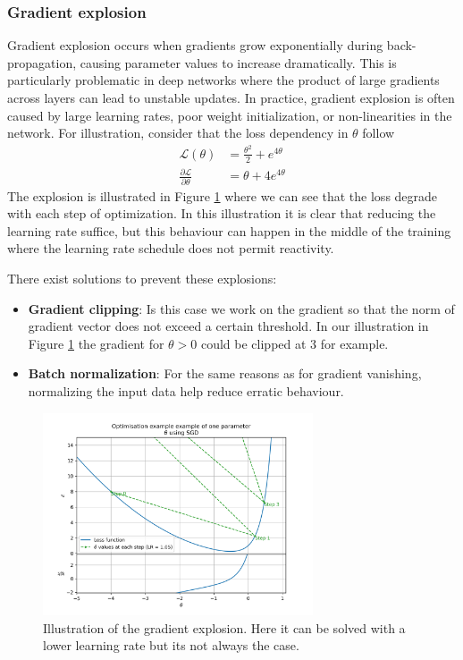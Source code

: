 \documentclass[../main.tex]{subfiles}
\begin{document}
\subsubsection{Gradient explosion}
Gradient explosion occurs when gradients grow exponentially during back-propagation, causing parameter values to increase dramatically. This is particularly problematic in deep networks where the product of large gradients across layers can lead to unstable updates. In practice, gradient explosion is often caused by large learning rates, poor weight initialization, or non-linearities in the network.
For illustration, consider that the loss dependency in $\theta$ follow
\begin{align*}
  \mathcal{L}(\theta) &= \frac{\theta^2}{2} + e^{4\theta} \\
  \frac{\partial \mathcal{L}}{\partial \theta} &= \theta + 4e^{4\theta}
\end{align*}
The explosion is illustrated in Figure \ref{fig:ml:explosion} where we can see that the loss degrade with each step of optimization. In this illustration it is clear that reducing the learning rate suffice, but this behaviour can happen in the middle of the training where the learning rate schedule does not permit reactivity.

There exist solutions to prevent these explosions:
\begin{itemize}
  \item \textbf{Gradient clipping}: Is this case we work on the gradient so that the norm of gradient vector does not exceed a certain threshold. In our illustration in Figure \ref{fig:ml:explosion} the gradient for $\theta > 0$ could be clipped at 3 for example.
  \item \textbf{Batch normalization}: For the same reasons as for gradient vanishing, normalizing the input data help reduce erratic behaviour.
\end{itemize}


\begin{figure}[ht]
  \centering
  \includegraphics[height=6cm]{scripts/plots/MSE_explosion_illustration.png}
  \caption{Illustration of the gradient explosion. Here it can be solved with a lower learning rate but its not always the case.}
  \label{fig:ml:explosion}
\end{figure}
\end{document}
